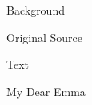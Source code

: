 			\begin{description}
				\item[Background]
			\end{description}
			
			
			\begin{description}
				\item[Original Source]
			\end{description}
			
			
			\begin{description}
				\item[Text]
			\end{description}
			

				My Dear Emma


